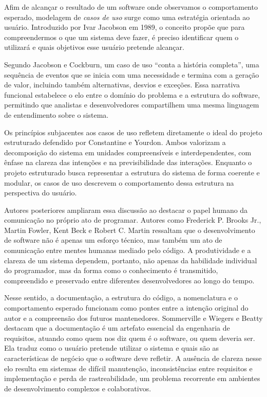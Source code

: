\documentclass[12pt,a4paper]{article}
\begin{document}
Afim de alcançar o resultado de um software onde observamos o comportamento esperado, modelagem de \textit{casos de uso} surge como uma estratégia orientada ao usuário. Introduzido por Ivar Jacobson em 1989, o conceito propõe que para compreendermos o que um sistema deve fazer, é preciso identificar quem o utilizará e quais objetivos esse usuário pretende alcançar. 

Segundo Jacobson e Cockburn, um caso de uso “conta a história completa”, uma sequência de eventos que se inicia com uma necessidade e termina com a geração de valor, incluindo também alternativas, desvios e exceções. Essa narrativa funcional estabelece o elo entre o domínio do problema e a estrutura do software, permitindo que analistas e desenvolvedores compartilhem uma mesma linguagem de entendimento sobre o sistema.

Os princípios subjacentes aos casos de uso refletem diretamente o ideal do projeto estruturado defendido por Constantine e Yourdon. Ambos valorizam a decomposição do sistema em unidades compreensíveis e interdependentes, com ênfase na clareza das intenções e na previsibilidade das interações. Enquanto o projeto estruturado busca representar a estrutura do sistema de forma coerente e modular, os casos de uso descrevem o comportamento dessa estrutura na perspectiva do usuário.

Autores posteriores ampliaram essa discussão ao destacar o papel humano da comunicação no próprio ato de programar. Autores como Frederick P. Brooks Jr., Martin Fowler, Kent Beck e Robert C. Martin ressaltam que o desenvolvimento de software não é apenas um esforço técnico, mas também um ato de comunicação entre mentes humanas mediado pelo código. A produtividade e a clareza de um sistema dependem, portanto, não apenas da habilidade individual do programador, mas da forma como o conhecimento é transmitido, compreendido e preservado entre diferentes desenvolvedores ao longo do tempo.

Nesse sentido, a documentação, a estrutura do código, a nomenclatura e o comportamento esperado funcionam como pontes entre a intenção original do autor e a compreensão dos futuros mantenedores. Sommerville e Wiegers e Beatty  destacam que a documentação é um artefato essencial da engenharia de requisitos, atuando como quem nos diz quem é o software, ou quem deveria ser. Ela traduz como o usuário pretende utilizar o sistema e quais são as características de negócio que o software deve refletir. A ausência de clareza nesse elo resulta em sistemas de difícil manutenção, inconsistências entre requisitos e implementação e perda de rastreabilidade, um problema recorrente em ambientes de desenvolvimento complexos e colaborativos.
\end{document}
